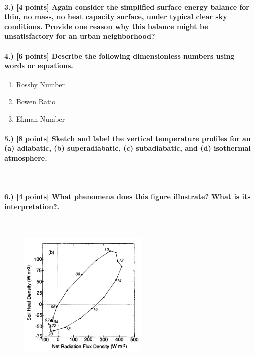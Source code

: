 \documentclass[11pt]{article}
\begin{document}
\paragraph{3.) [4 points] Again consider the simplified surface energy balance for thin, no mass, no heat capacity surface, under typical clear sky conditions. Provide one reason why this balance might be unsatisfactory for an urban neighborhood?}

\paragraph{4.) [6 points] Describe the following dimensionless numbers using words or equations.}
\begin{enumerate}[label=\alph*.)]
\item Rossby Number
\vspace{20pt}
\item Bowen Ratio
\vspace{20pt}
\item Ekman Number
\end{enumerate}

\paragraph{5.) [8 points] Sketch and label the vertical temperature profiles for an (a) adiabatic, (b) superadiabatic, (c) subadiabatic, and (d) isothermal atmosphere.}~\\

\vspace{225pt}

\paragraph{6.) [4 points] What phenomena does this figure illustrate? What is its interpretation?.}~\\
\begin{figure}[H]
	\centering
	\includegraphics[width=0.55\textwidth]{fig1}
\end{figure}
\end{document}
